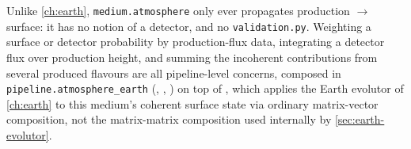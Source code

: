 \begin{notebox}[title={Detector Composition Lives in the Pipeline Layer}]
Unlike \cref{ch:earth}, \texttt{medium.atmosphere} only ever propagates
production $\to$ surface: it has no notion of a detector, and no
\texttt{validation.py}. Weighting a surface or detector probability by
production-flux data, integrating a detector flux over production height,
and summing the incoherent contributions from several produced flavours are
all pipeline-level concerns, composed in
\texttt{pipeline.atmosphere\_earth} (,
,
) on top of
, which
applies the Earth evolutor of \cref{ch:earth} to this medium's coherent
surface state via ordinary matrix-vector composition, not the matrix-matrix
composition used internally by \cref{sec:earth-evolutor}.
\end{notebox}
